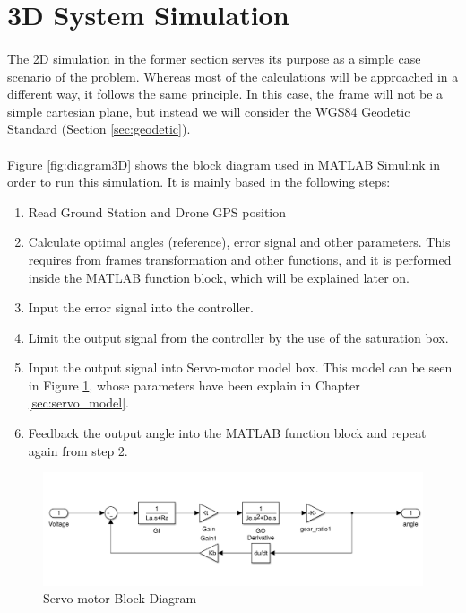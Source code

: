 \section{3D System Simulation}\label{sec:3d_sim}

\paragraph{}The 2D simulation in the former section serves its purpose as a simple case scenario of the problem. Whereas most of the calculations will be approached in a different way, it follows the same principle.
In this case, the frame will not be a simple cartesian plane, but instead we will consider the WGS84 Geodetic Standard (Section \ref{sec:geodetic}).


\paragraph{} Figure \ref{fig:diagram3D} shows the block diagram used in MATLAB Simulink in order to run this simulation. It is mainly based in the following steps:
\begin{enumerate}
\item{Read Ground Station and Drone GPS position}
\item{Calculate optimal angles (reference), error signal and other parameters. This requires from frames transformation and other functions, and it is performed inside the MATLAB function block, which will be explained later on.}
\item{Input the error signal into the controller.}
\item{Limit the output signal from the controller by the use of the saturation box.}
\item{Input the output signal into Servo-motor model box. This model can be seen in Figure \ref{fig:servomotor3D}, whose parameters have been explain in Chapter \ref{sec:servo_model}.}
\item{Feedback the output angle into the MATLAB function block and repeat again from step 2.}
\end{enumerate}

\begin{figure}[h]
	\centering
	\includegraphics[width=1.1\textwidth]{figures/servomotor_3D.png}
	\caption{Servo-motor Block Diagram}
   	\label{fig:servomotor3D}
\end{figure}

